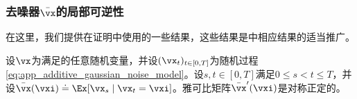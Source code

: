 \documentclass[../../book-main_zh.tex]{subfiles}
\begin{document}
\subsubsection{去噪器\(\bar{\vx}\)的局部可逆性}

在这里，我们提供在证明中使用的一些结果，这些结果是\cite{Gribonval2011-pf}中相应结果的适当推广。

\begin{lemma}\label{lem:gribonval_A1}
    设\(\vx\)为满足的任意随机变量，并设\((\vx_{t})_{t \in [0, T]}\)为随机过程\eqref{eq:app_additive_gaussian_noise_model}。设\(s, t \in [0, T]\)满足\(0 \leq s < t \leq T\)，并设\(\bar{\vx}(\vxi) \doteq \Ex[\vx_{s} \mid \vx_{t} = \vxi]\)。雅可比矩阵\(\bar{\vx}^{\prime}(\vxi)\)是对称正定的。
\end{lemma}
\end{document}
